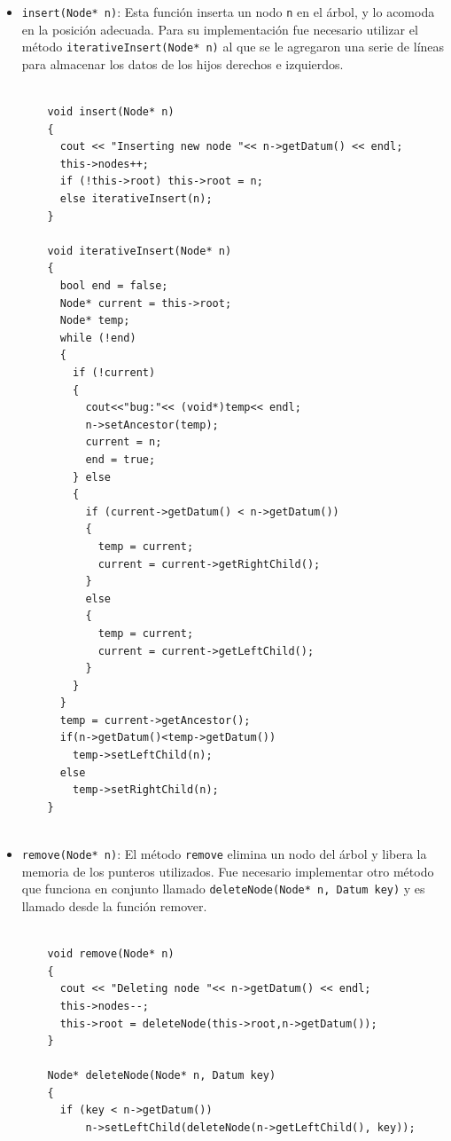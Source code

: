 \begin{itemize}
    \item \texttt{insert(Node* n)}: Esta función inserta un nodo \texttt{n} en el árbol, y lo acomoda en la posición adecuada. Para su implementación fue necesario utilizar el método \texttt{iterativeInsert(Node* n)} al que se le agregaron una serie de líneas para almacenar los datos de los hijos derechos e izquierdos.
    
    \begin{verbatim}
    
    void insert(Node* n)
    {
      cout << "Inserting new node "<< n->getDatum() << endl;
      this->nodes++;
      if (!this->root) this->root = n;
      else iterativeInsert(n);
    }
    
    void iterativeInsert(Node* n) 
    {
      bool end = false;
      Node* current = this->root;
      Node* temp;
      while (!end)
      {
        if (!current)
        {
          cout<<"bug:"<< (void*)temp<< endl;
          n->setAncestor(temp);
          current = n;
          end = true;
        } else
        {
          if (current->getDatum() < n->getDatum())
          {
            temp = current;
            current = current->getRightChild();
          }
          else
          {
            temp = current;
            current = current->getLeftChild();
          }
        }
      }
      temp = current->getAncestor();
      if(n->getDatum()<temp->getDatum())
        temp->setLeftChild(n);
      else
        temp->setRightChild(n);
    }
    
    \end{verbatim}
    
    \item \texttt{remove(Node* n)}: El método \texttt{remove} elimina un nodo del árbol y libera la memoria de los punteros utilizados. Fue necesario implementar otro método que funciona en conjunto llamado \texttt{deleteNode(Node* n, Datum key)} y es llamado desde la función remover.
    
    \begin{verbatim}
    
    void remove(Node* n)
    {
      cout << "Deleting node "<< n->getDatum() << endl;
      this->nodes--;
      this->root = deleteNode(this->root,n->getDatum());
    }
    
    Node* deleteNode(Node* n, Datum key)
    {
      if (key < n->getDatum())
          n->setLeftChild(deleteNode(n->getLeftChild(), key));


\end{verbatim}
\end{itemize}
